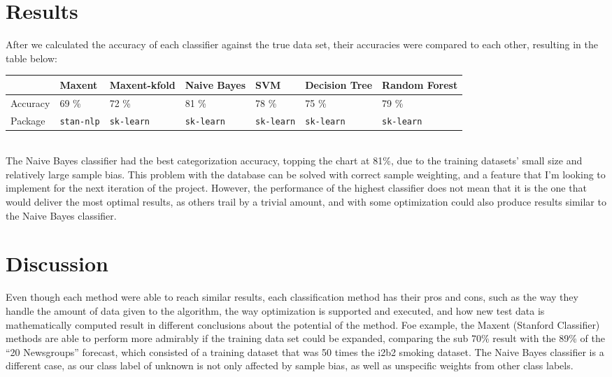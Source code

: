 \documentclass[12pt]{article}
\begin{document}
\section{Results}
After we calculated the accuracy of each classifier against the true data set, their accuracies were compared to each other, resulting in the table below:
\begin{table}[h]
\centering

\label{my-label}
\begin{tabular}{|l|l|l|l|l|l|l|}
\hline
         & Maxent              & Maxent-kfold     & Naive Bayes        & SVM                & Decision Tree      & Random Forest      \\ \hline
Accuracy & 69 \%                  & 72 \%                 & 81 \%              & 78 \%              & 75  \%               & 79  \%      \\ \hline
Package  & \texttt{stan-nlp} & \texttt{sk-learn} & \texttt{sk-learn} & \texttt{sk-learn} & \texttt{sk-learn} & \texttt{sk-learn} \\
\hline
\end{tabular}
\end{table}
\\
The Naive Bayes classifier had the best categorization accuracy, topping the chart at 81\%, due to the training datasets' small size and relatively large sample bias. This problem with the database can be solved with correct sample weighting, and a feature that I'm looking to implement for the next iteration of the project. However, the performance of the highest classifier does not mean that it is the one that would deliver the most optimal results, as others trail by a trivial amount, and with some optimization could also produce results similar to the Naive Bayes classifier.

\section{Discussion}
Even though each method were able to reach similar results, each classification method has their pros and cons, such as the way they handle the amount of data given to the algorithm, the way optimization is supported and executed, and how new test data is mathematically computed result in different conclusions about the potential of the method. Foe example, the Maxent (Stanford Classifier) methods are able to perform more admirably if the training data set could be expanded, comparing the sub 70\% result with the 89\% of the ``20 Newsgroups'' forecast, which consisted of a training dataset that was 50 times the i2b2 smoking dataset. The Naive Bayes classifier is a different case, as our class label of unknown is not only affected by sample bias, as well as unspecific weights from other class labels.
\end{document}

